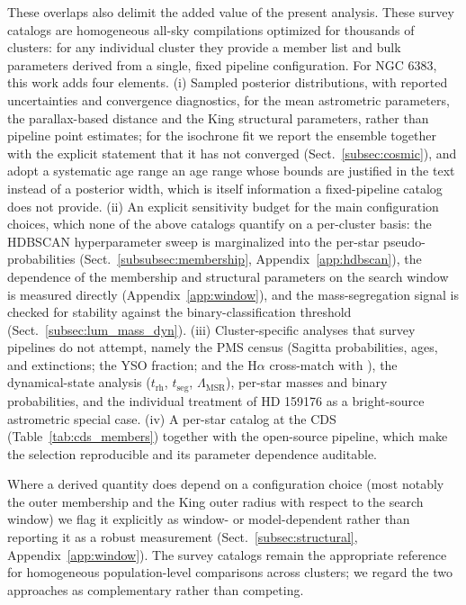 \documentclass{aa}
\providecommand{\DIFaddtex}[1]{{\protect\color[rgb]{0,0,0.7}#1}} %
\providecommand{\DIFdeltex}[1]{{\protect\color[rgb]{0.65,0,0}\footnotesize #1}} %
\providecommand{\DIFaddbegin}{} %
\providecommand{\DIFaddend}{} %
\providecommand{\DIFdelbegin}{} %
\providecommand{\DIFdelend}{} %
\providecommand{\DIFadd}[1]{\texorpdfstring{\DIFaddtex{#1}}{#1}} %
\providecommand{\DIFdel}[1]{\texorpdfstring{\DIFdeltex{#1}}{}} %
\providecommand{\DIFscaledelfig}{0.5}
\newlength{\DIFdelgraphicswidth} %
\newlength{\DIFdelgraphicsheight} %
\providecommand{\DIFaddincludegraphics}[2][]{{\color{blue}\fbox{\DIFOincludegraphics[#1]{#2}}}} %
\providecommand{\DIFdelincludegraphics}[2][]{%
\sbox{\DIFdelgraphicsbox}{\DIFOincludegraphics[#1]{#2}}%
\settoboxwidth{\DIFdelgraphicswidth}{\DIFdelgraphicsbox} %
\settoboxtotalheight{\DIFdelgraphicsheight}{\DIFdelgraphicsbox} %
\scalebox{\DIFscaledelfig}{%
\parbox[b]{\DIFdelgraphicswidth}{\usebox{\DIFdelgraphicsbox}\\[-\baselineskip] \rule{\DIFdelgraphicswidth}{0em}}\llap{\resizebox{\DIFdelgraphicswidth}{\DIFdelgraphicsheight}{%
\setlength{\unitlength}{\DIFdelgraphicswidth}%
\begin{picture}(1,1)%
\thicklines\linethickness{2pt} %
{\color[rgb]{1,0,0}\put(0,0){\framebox(1,1){}}}%
{\color[rgb]{1,0,0}\put(0,0){\line( 1,1){1}}}%
{\color[rgb]{1,0,0}\put(0,1){\line(1,-1){1}}}%
\end{picture}%
}\hspace*{3pt}}} %
} %
\DeclareRobustCommand{\DIFaddbegin}{\DIFOaddbegin \let\includegraphics\DIFaddincludegraphics} %
\DeclareRobustCommand{\DIFaddend}{\DIFOaddend \let\includegraphics\DIFOincludegraphics} %
\DeclareRobustCommand{\DIFdelbegin}{\DIFOdelbegin \let\includegraphics\DIFdelincludegraphics} %
\DeclareRobustCommand{\DIFdelend}{\DIFOaddend \let\includegraphics\DIFOincludegraphics} %
\begin{document}
These overlaps also delimit the added value of the present analysis. These survey catalogs are homogeneous all-sky compilations optimized for thousands of clusters: for any individual cluster they provide a member list and bulk parameters derived from a single, fixed pipeline configuration. For NGC 6383, this work adds four elements. (i) Sampled posterior distributions, with reported uncertainties and convergence diagnostics, for the mean astrometric parameters, the parallax-based distance and the King structural parameters, rather than pipeline point estimates; for the isochrone fit we report the ensemble together with the explicit statement that it has not converged (Sect.~\ref{subsec:cosmic}), and adopt \DIFdelbegin \DIFdel{a systematic age range }\DIFdelend \DIFaddbegin \DIFadd{an age range whose bounds are justified in the text }\DIFaddend instead of a posterior width, which is itself information a fixed-pipeline catalog does not provide. (ii) An explicit sensitivity budget for the main configuration choices, which none of the above catalogs quantify on a per-cluster basis: the \textsc{HDBSCAN} hyperparameter sweep is marginalized into the per-star pseudo-probabilities (Sect.~\ref{subsubsec:membership}, Appendix~\ref{app:hdbscan}), the dependence of the membership and structural parameters on the search window is measured directly (Appendix~\ref{app:window}), and the mass-segregation signal is checked for stability against the binary-classification threshold (Sect.~\ref{subsec:lum_mass_dyn}). (iii) Cluster-specific analyses that survey pipelines do not attempt, namely the PMS census (Sagitta probabilities, ages, and extinctions; the YSO fraction; and the H$\alpha$ cross-match with \citealt{2010AA...511A..25R}), the dynamical-state analysis ($t_{\mathrm{rh}}$, $t_{\mathrm{seg}}$, $\Lambda_{\mathrm{MSR}}$), per-star masses and binary probabilities, and the individual treatment of HD 159176 as a bright-source astrometric special case. (iv) A per-star catalog at the CDS (Table~\ref{tab:cds_members}) together with the open-source pipeline, which make the selection reproducible and its parameter dependence auditable.  %

Where a derived quantity does depend on a configuration choice (most notably the outer membership and the King outer radius with respect to the search window) we flag it explicitly as window- or model-dependent rather than reporting it as a robust measurement (Sect.~\ref{subsec:structural}, Appendix~\ref{app:window}). The survey catalogs remain the appropriate reference for homogeneous population-level comparisons across clusters; we regard the two approaches as complementary rather than competing.
\end{document}
